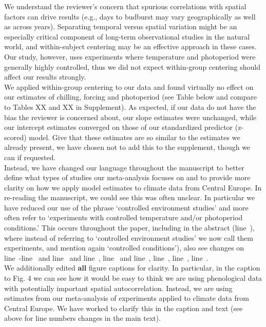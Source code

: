 \documentclass[11pt, a4paper]{article}
\newcommand{\lr}[1]{line~\lineref{#1}}
\begin{document}
We understand the reviewer's concern that spurious correlations with spatial factors can drive results (e.g., days to budburst may vary geographically as well as across years). Separating temporal versus spatial variation might be an especially critical component of long-term observational studies in the natural world, and within-subject centering may be an effective approach in these cases. Our study, however, uses experiments where temperature and photoperiod were generally highly controlled, thus we did not expect within-group centering should affect our results strongly. \\

We applied within-group centering to our data and found virtually no effect on our estimates of chilling, forcing and photoperiod (see Table below and compare to Tables XX and XX in Supplement). As expected, if our data do not have the bias the reviewer is concerned about, our slope estimates were unchanged, while our intercept estimates converged on those of our standardized predictor (z-scored) model. Give that these estimates are so similar to the estimates we already present, we have chosen not to add this to the supplement, though we can if requested.\\

Instead, we have changed our language throughout the manuscript to better define what types of studies our meta-analysis focuses on and to provide more clarity on how we apply model estimates to climate data from Central Europe. In re-reading the manuscript, we could see this was often unclear. In particular we have reduced our use of the phrase `controlled environment studies' and more often refer to `experiments with controlled temperature and/or photoperiod conditions.' This occurs throughout the paper, including in the abstract (\lr{ee1}), where instead of referring to `controlled environment studies' we now call them experiments, and mention again `controlled conditions'), also see changes on \lr{ee2start}-\lr{ee2end} and \lr{ee3start} and \lr{ee4}, \lr{ee5} and \lr{ee6}, \lr{ee7}, \lr{ee8}, \lr{ee9}.\\

We additionally edited {\bf all} figure captions for clarity. In particular, in the caption to Fig. 4 we can see how it would be easy to think we are using phenological data with potentially important spatial autocorrelation. Instead, we are using estimates from our meta-analysis of experiments applied to climate data from Central Europe. We have worked to clarify this in the caption and text (see above for line numbers changes in the main text). \\%
\end{document}
